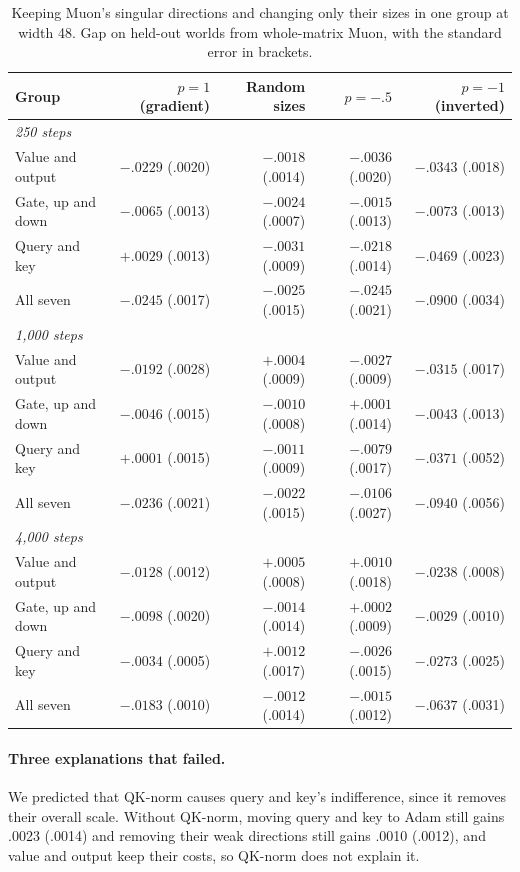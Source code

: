 \documentclass[11pt]{article}
\begin{document}
\begin{table}[t]
\centering
\small
\begin{tabular}{lrrrr}
\toprule
Group & $p=1$ (gradient) & Random sizes & $p=-.5$ & $p=-1$ (inverted) \\
\midrule
\multicolumn{5}{l}{\emph{250 steps}} \\
Value and output & $-.0229$ (.0020) & $-.0018$ (.0014) & $-.0036$ (.0020) & $-.0343$ (.0018) \\
Gate, up and down & $-.0065$ (.0013) & $-.0024$ (.0007) & $-.0015$ (.0013) & $-.0073$ (.0013) \\
Query and key & $+.0029$ (.0013) & $-.0031$ (.0009) & $-.0218$ (.0014) & $-.0469$ (.0023) \\
All seven & $-.0245$ (.0017) & $-.0025$ (.0015) & $-.0245$ (.0021) & $-.0900$ (.0034) \\
\midrule
\multicolumn{5}{l}{\emph{1,000 steps}} \\
Value and output & $-.0192$ (.0028) & $+.0004$ (.0009) & $-.0027$ (.0009) & $-.0315$ (.0017) \\
Gate, up and down & $-.0046$ (.0015) & $-.0010$ (.0008) & $+.0001$ (.0014) & $-.0043$ (.0013) \\
Query and key & $+.0001$ (.0015) & $-.0011$ (.0009) & $-.0079$ (.0017) & $-.0371$ (.0052) \\
All seven & $-.0236$ (.0021) & $-.0022$ (.0015) & $-.0106$ (.0027) & $-.0940$ (.0056) \\
\midrule
\multicolumn{5}{l}{\emph{4,000 steps}} \\
Value and output & $-.0128$ (.0012) & $+.0005$ (.0008) & $+.0010$ (.0018) & $-.0238$ (.0008) \\
Gate, up and down & $-.0098$ (.0020) & $-.0014$ (.0014) & $+.0002$ (.0009) & $-.0029$ (.0010) \\
Query and key & $-.0034$ (.0005) & $+.0012$ (.0017) & $-.0026$ (.0015) & $-.0273$ (.0025) \\
All seven & $-.0183$ (.0010) & $-.0012$ (.0014) & $-.0015$ (.0012) & $-.0637$ (.0031) \\
\bottomrule
\end{tabular}
\caption{Keeping Muon's singular directions and changing only their sizes in one group at width 48. Gap on held-out worlds from whole-matrix Muon, with the standard error in brackets.}
\label{tab:shape}
\end{table}

\paragraph{Three explanations that failed.} We predicted that QK-norm causes query and key's indifference, since it removes their overall scale. Without QK-norm, moving query and key to Adam still gains .0023 (.0014) and removing their weak directions still gains .0010 (.0012), and value and output keep their costs, so QK-norm does not explain it.
\end{document}
